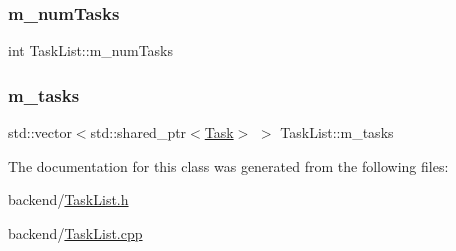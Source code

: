 \subsubsection{\texorpdfstring{m\+\_\+num\+Tasks}{m\_numTasks}}
{\footnotesize\ttfamily int Task\+List\+::m\+\_\+num\+Tasks}

\mbox{\label{class_task_list_a192cb3c6f59d6c4b428a6d909ce2035d}} 
\subsubsection{\texorpdfstring{m\+\_\+tasks}{m\_tasks}}
{\footnotesize\ttfamily std\+::vector$<$std\+::shared\+\_\+ptr$<$\mbox{\hyperlink{class_task}{Task}}$>$ $>$ Task\+List\+::m\+\_\+tasks}



The documentation for this class was generated from the following files\+:\begin{DoxyCompactItemize}
\item 
backend/\mbox{\hyperlink{_task_list_8h}{Task\+List.\+h}}\item 
backend/\mbox{\hyperlink{_task_list_8cpp}{Task\+List.\+cpp}}\end{DoxyCompactItemize}
